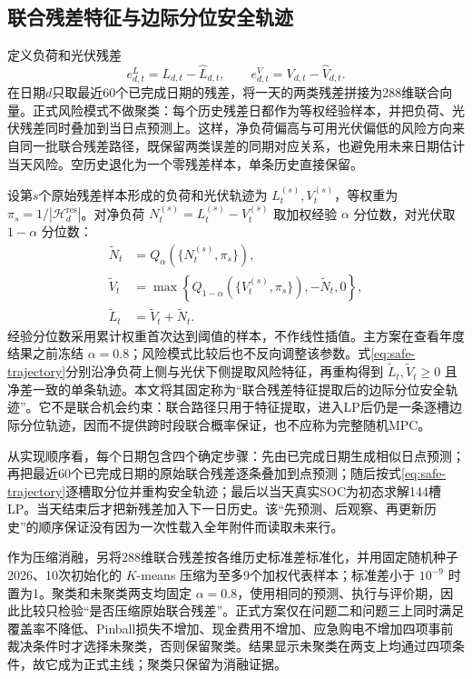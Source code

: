 \subsection{联合残差特征与边际分位安全轨迹}

定义负荷和光伏残差
\begin{equation}
 e^{L}_{d,t}=L_{d,t}-\widehat L_{d,t},\qquad
 e^{V}_{d,t}=V_{d,t}-\widehat V_{d,t}.
 \label{eq:residual}
\end{equation}
在日期$d$只取最近60个已完成日期的残差，将一天的两类残差拼接为288维联合向量。正式风险模式不做聚类：每个历史残差日都作为等权经验样本，并把负荷、光伏残差同时叠加到当日点预测上。这样，净负荷偏高与可用光伏偏低的风险方向来自同一批联合残差路径，既保留两类误差的同期对应关系，也避免用未来日期估计当天风险。空历史退化为一个零残差样本，单条历史直接保留。

设第$s$个原始残差样本形成的负荷和光伏轨迹为 $L^{(s)}_t,V^{(s)}_t$，等权重为 $\pi_s=1/|\mathcal H_d^{\mathrm{res}}|$。对净负荷 $N^{(s)}_t=L^{(s)}_t-V^{(s)}_t$ 取加权经验 $\alpha$ 分位数，对光伏取 $1-\alpha$ 分位数：
\begin{align}
 \widetilde N_t &= Q_{\alpha}\!\left(\{N^{(s)}_t,\pi_s\}\right),\\
 \widetilde V_t &= \max\left\{Q_{1-\alpha}\!\left(\{V^{(s)}_t,\pi_s\}\right),-\widetilde N_t,0\right\},\\
 \widetilde L_t &= \widetilde V_t+\widetilde N_t.
 \label{eq:safe-trajectory}
\end{align}
经验分位数采用累计权重首次达到阈值的样本，不作线性插值。主方案在查看年度结果之前冻结 $\alpha=0.8$；风险模式比较后也不反向调整该参数。式\eqref{eq:safe-trajectory}分别沿净负荷上侧与光伏下侧提取风险特征，再重构得到 $\widetilde L_t,\widetilde V_t\ge0$ 且净差一致的单条轨迹。本文将其固定称为“联合残差特征提取后的边际分位安全轨迹”。它不是联合机会约束：联合路径只用于特征提取，进入LP后仍是一条逐槽边际分位轨迹，因而不提供跨时段联合概率保证，也不应称为完整随机MPC。

从实现顺序看，每个日期包含四个确定步骤：先由已完成日期生成相似日点预测；再把最近60个已完成日期的原始联合残差逐条叠加到点预测；随后按式\eqref{eq:safe-trajectory}逐槽取分位并重构安全轨迹；最后以当天真实SOC为初态求解144槽LP。当天结束后才把新残差加入下一日历史。该“先预测、后观察、再更新历史”的顺序保证没有因为一次性载入全年附件而读取未来行。

作为压缩消融，另将288维联合残差按各维历史标准差标准化，并用固定随机种子2026、10次初始化的 $K$-means 压缩为至多9个加权代表样本；标准差小于 $10^{-9}$ 时置为1。聚类和未聚类两支均固定 $\alpha=0.8$，使用相同的预测、执行与评价期，因此比较只检验“是否压缩原始联合残差”。正式方案仅在问题二和问题三上同时满足覆盖率不降低、Pinball损失不增加、现金费用不增加、应急购电不增加四项事前裁决条件时才选择未聚类，否则保留聚类。结果显示未聚类在两支上均通过四项条件，故它成为正式主线；聚类只保留为消融证据。

